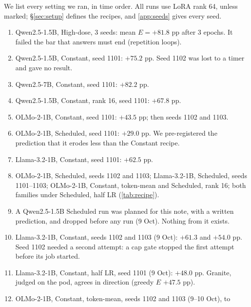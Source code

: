 \documentclass[11pt]{article}
\begin{document}
We list every setting we ran, in time order. All
runs use LoRA rank 64, unless marked; \S\ref{sec:setup} defines the recipes,
and \cref{app:seeds} gives every seed.
\begin{enumerate}
  \item Qwen2.5-1.5B, High-dose, 3 seeds: mean $E = +81.8$ pp after 3 epochs.
        It failed the bar that answers must end (repetition loops).
  \item Qwen2.5-1.5B, Constant, seed 1101: $+75.2$ pp. Seed 1102 was lost to a
        timer and gave no result.
  \item Qwen2.5-7B, Constant, seed 1101: $+82.2$ pp.
  \item Qwen2.5-1.5B, Constant, rank 16, seed 1101: $+67.8$ pp.
  \item OLMo-2-1B, Constant, seed 1101: $+43.5$ pp; then seeds 1102 and 1103.
  \item OLMo-2-1B, Scheduled, seed 1101: $+29.0$ pp. We pre-registered the
        prediction that it erodes less than the Constant recipe.
  \item Llama-3.2-1B, Constant, seed 1101: $+62.5$ pp.
  \item OLMo-2-1B, Scheduled, seeds 1102 and 1103; Llama-3.2-1B, Scheduled,
        seeds 1101--1103; OLMo-2-1B, Constant, token-mean and Scheduled, rank
        16; both families under Scheduled, half LR (\cref{tab:recipe}).
  \item A Qwen2.5-1.5B Scheduled run was planned for this note, with a written
        prediction, and dropped before any run (9 Oct). Nothing from it exists.
  \item Llama-3.2-1B, Constant, seeds 1102 and 1103 (9 Oct): $+61.3$ and
        $+54.0$ pp. Seed 1102 needed a second attempt: a cap gate stopped the
        first attempt before its job started.
  \item Llama-3.2-1B, Constant, half LR, seed 1101 (9 Oct): $+48.0$ pp. Granite,
        judged on the pod, agrees in direction (greedy $E$ $+47.5$ pp).
  \item OLMo-2-1B, Constant, token-mean, seeds 1102 and 1103 (9--10 Oct), to

\end{enumerate}
\end{document}
